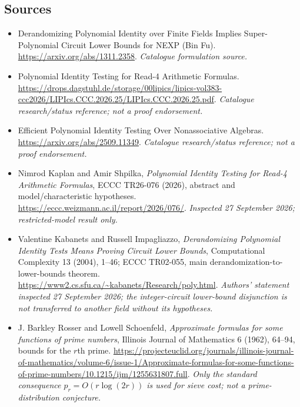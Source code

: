 \documentclass[11pt,a4paper]{article}
\numberwithin{equation}{section}
\begin{document}
\subsection{Sources}
\begin{itemize}\raggedright
\item[\textnormal{[S1]}]\hypertarget{source:statement:1}{} Derandomizing Polynomial Identity over Finite Fields Implies Super-Polynomial Circuit Lower Bounds for NEXP (Bin Fu).
\url{https://arxiv.org/abs/1311.2358}.
{\small\textit{Catalogue formulation source.}}
\item[\textnormal{[S2]}]\hypertarget{source:statement:2}{} Polynomial Identity Testing for Read-4 Arithmetic Formulas.
\url{https://drops.dagstuhl.de/storage/00lipics/lipics-vol383-ccc2026/LIPIcs.CCC.2026.25/LIPIcs.CCC.2026.25.pdf}.
{\small\textit{Catalogue research/status reference; not a proof endorsement.}}
\item[\textnormal{[S3]}]\hypertarget{source:statement:3}{} Efficient Polynomial Identity Testing Over Nonassociative Algebras.
\url{https://arxiv.org/abs/2509.11349}.
{\small\textit{Catalogue research/status reference; not a proof endorsement.}}
\item[\textnormal{[E1]}]\hypertarget{extra:statement:1}{} Nimrod Kaplan and Amir Shpilka,
\emph{Polynomial Identity Testing for Read-4 Arithmetic Formulas},
ECCC TR26-076 (2026), abstract and model/characteristic hypotheses.
\url{https://eccc.weizmann.ac.il/report/2026/076/}.
{\small\textit{Inspected 27 September 2026; restricted-model result only.}}
\item[\textnormal{[E2]}]\hypertarget{extra:statement:2}{} Valentine Kabanets and Russell Impagliazzo,
\emph{Derandomizing Polynomial Identity Tests Means Proving Circuit Lower Bounds},
Computational Complexity 13 (2004), 1--46; ECCC TR02-055,
main derandomization-to-lower-bounds theorem.
\url{https://www2.cs.sfu.ca/~kabanets/Research/poly.html}.
{\small\textit{Authors' statement inspected 27 September 2026; the integer-circuit
lower-bound disjunction is not transferred to another field without its hypotheses.}}
\item[\textnormal{[E3]}]\hypertarget{extra:statement:3}{} J. Barkley Rosser and Lowell Schoenfeld,
\emph{Approximate formulas for some functions of prime numbers},
Illinois Journal of Mathematics 6 (1962), 64--94, bounds for the $r$th prime.
\url{https://projecteuclid.org/journals/illinois-journal-of-mathematics/volume-6/issue-1/Approximate-formulas-for-some-functions-of-prime-numbers/10.1215/ijm/1255631807.full}.
{\small\textit{Only the standard consequence $p_r=O(r\log(2r))$ is used for
sieve cost; not a prime-distribution conjecture.}}
\end{itemize}
\end{document}

